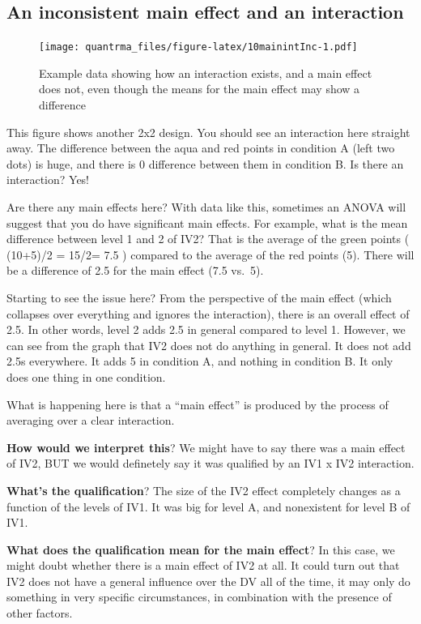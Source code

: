 \documentclass[
]{book}
\begin{document}
\hypertarget{an-inconsistent-main-effect-and-an-interaction}{%
\subsection{An inconsistent main effect and an interaction}\label{an-inconsistent-main-effect-and-an-interaction}}

\begin{figure}
\centering
\texttt{[image: quantrma\_files/figure-latex/10mainintInc-1.pdf]}
\caption{\label{fig:10mainintInc}Example data showing how an interaction exists, and a main effect does not, even though the means for the main effect may show a difference}
\end{figure}

This figure shows another 2x2 design. You should see an interaction here straight away. The difference between the aqua and red points in condition A (left two dots) is huge, and there is 0 difference between them in condition B. Is there an interaction? Yes!

Are there any main effects here? With data like this, sometimes an ANOVA will suggest that you do have significant main effects. For example, what is the mean difference between level 1 and 2 of IV2? That is the average of the green points ( (10+5)/2 = 15/2= 7.5 ) compared to the average of the red points (5). There will be a difference of 2.5 for the main effect (7.5 vs.~5).

Starting to see the issue here? From the perspective of the main effect (which collapses over everything and ignores the interaction), there is an overall effect of 2.5. In other words, level 2 adds 2.5 in general compared to level 1. However, we can see from the graph that IV2 does not do anything in general. It does not add 2.5s everywhere. It adds 5 in condition A, and nothing in condition B. It only does one thing in one condition.

What is happening here is that a ``main effect'' is produced by the process of averaging over a clear interaction.

\textbf{How would we interpret this}? We might have to say there was a main effect of IV2, BUT we would definetely say it was qualified by an IV1 x IV2 interaction.

\textbf{What's the qualification}? The size of the IV2 effect completely changes as a function of the levels of IV1. It was big for level A, and nonexistent for level B of IV1.

\textbf{What does the qualification mean for the main effect}? In this case, we might doubt whether there is a main effect of IV2 at all. It could turn out that IV2 does not have a general influence over the DV all of the time, it may only do something in very specific circumstances, in combination with the presence of other factors.
\end{document}
